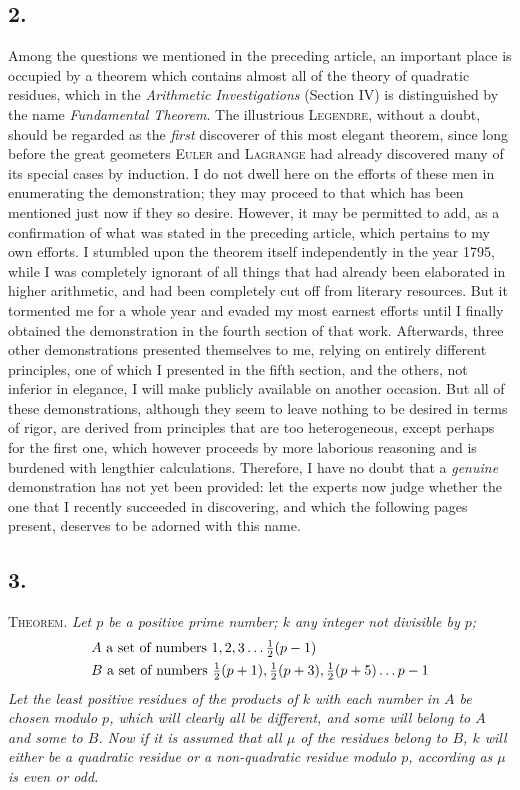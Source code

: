 \documentclass[twoside,12pt, showframe]{memoir}
\let\oldfrac\frac
\def\frac#1#2{\mathchoice{\tfrac{#1}{#2}}{\oldfrac{#1}{#2}}{\genfrac{}{}{}{2}{#1}{#2\mathstrut}}{\genfrac{}{}{}{3}{#1}{#2\mathstrut}}}
\begin{document}
\subsection*{2.}

Among the questions we mentioned in the preceding article, an important place is occupied by a theorem which contains almost all of the theory of quadratic residues, which in the \textit{Arithmetic Investigations} (Section IV) is distinguished by the name \textit{Fundamental Theorem}. The illustrious \textsc{Legendre}, without a doubt, should be regarded as the \textit{first} discoverer of this most elegant theorem, since long before the great geometers \textsc{Euler} and \textsc{Lagrange} had already discovered many of its special cases by induction. I do not dwell here on the efforts of these men in enumerating the demonstration; they may proceed to that which has been mentioned just now if they so desire. However, it may be permitted to add, as a confirmation of what was stated in the preceding article, which pertains to my own efforts. I stumbled upon the theorem itself independently in the year 1795, while I was completely ignorant of all things that had already been elaborated in higher arithmetic, and had been completely cut off from literary resources. But it tormented me for a whole year and evaded my most earnest efforts until I finally obtained the demonstration in the fourth section of that work. Afterwards, three other demonstrations presented themselves to me, relying on entirely different principles, one of which I presented in the fifth section, and the others, not inferior in elegance, I will make publicly available on another occasion. But all of these demonstrations, although they seem to leave nothing to be desired in terms of rigor, are derived from principles that are too heterogeneous, except perhaps for the first one, which however proceeds by more laborious reasoning and is burdened with lengthier calculations. Therefore, I have no doubt that a \textit{genuine} demonstration has not yet been provided: let the experts now judge whether the one that I recently succeeded in discovering, and which the following pages present, deserves to be adorned with this name.
%

\subsection*{3.}

\textsc{Theorem.} \textit{Let \(p\) be a positive prime number; \(k\) any integer not divisible by \(p\);
\[\begin{aligned}
&A \text{ a set of numbers }1,2,3 \ldots \frac{1}{2}(p-1)\\
&B \text{ a set of numbers } \frac{1}{2}(p+1), \frac{1}{2}(p+3), \frac{1}{2}(p+5) \ldots p-1
\end{aligned}\]
Let the least positive residues of the products of \(k\) with each number in \(A\) be chosen modulo \(p\), which will clearly all be different, and some will belong to \(A\) and some to \(B\). Now if it is assumed that all \(\mu\) of the residues belong to \(B\), \(k\) will either be a quadratic residue or a non-quadratic residue modulo \(p\), according as \(\mu\) is even or odd.}
\end{document}

